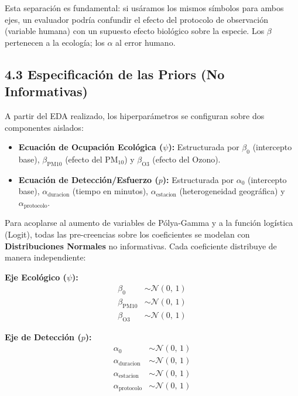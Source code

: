 \documentclass[12pt]{article}
\begin{document}
Esta separación es fundamental: si usáramos los mismos símbolos para ambos ejes, un evaluador podría confundir el efecto del protocolo de observación (variable humana) con un supuesto efecto biológico sobre la especie. Los $\beta$ pertenecen a la ecología; los $\alpha$ al error humano.

\subsection*{4.3 Especificación de las Priors (No Informativas)}

A partir del EDA realizado, los hiperparámetros se configuran sobre dos componentes aislados:

\begin{itemize}
  \item \textbf{Ecuación de Ocupación Ecológica ($\psi$):} Estructurada por $\beta_0$ (intercepto base), $\beta_{\text{PM10}}$ (efecto del $\text{PM}_{10}$) y $\beta_{\text{O3}}$ (efecto del Ozono).
  \item \textbf{Ecuación de Detección/Esfuerzo ($p$):} Estructurada por $\alpha_0$ (intercepto base), $\alpha_{\text{duracion}}$ (tiempo en minutos), $\alpha_{\text{estacion}}$ (heterogeneidad geográfica) y $\alpha_{\text{protocolo}}$.
\end{itemize}

Para acoplarse al aumento de variables de Pólya-Gamma y a la función logística (Logit), todas las pre-creencias sobre los coeficientes se modelan con \textbf{Distribuciones Normales} no informativas. Cada coeficiente distribuye de manera independiente:

\medskip
\textbf{Eje Ecológico ($\psi$):}
\begin{align}
  \beta_0 &\sim \mathcal{N}(0,\, 1) \\
  \beta_{\text{PM10}} &\sim \mathcal{N}(0,\, 1) \\
  \beta_{\text{O3}} &\sim \mathcal{N}(0,\, 1)
\end{align}

\textbf{Eje de Detección ($p$):}
\begin{align}
  \alpha_0 &\sim \mathcal{N}(0,\, 1) \\
  \alpha_{\text{duracion}} &\sim \mathcal{N}(0,\, 1) \\
  \alpha_{\text{estacion}} &\sim \mathcal{N}(0,\, 1) \\
  \alpha_{\text{protocolo}} &\sim \mathcal{N}(0,\, 1)
\end{align}
\end{document}
